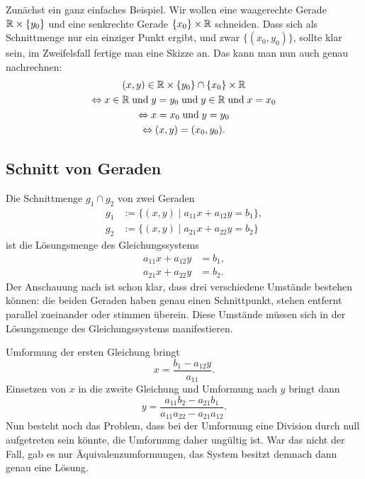 Zunächst ein ganz einfaches Beispiel. Wir wollen eine waagerechte
Gerade $\mathbb R\times\{y_0\}$ und eine senkrechte Gerade $\{x_0\}\times\mathbb R$
schneiden. Dass sich als Schnittmenge nur ein einziger Punkt ergibt,
und zwar $\{(x_0,y_0)\}$, sollte klar sein, im Zweifelsfall fertige
man eine Skizze an. Das kann man nun auch
genau nachrechnen:%
\begin{gather*}
(x,y)\in\mathbb R\times\{y_0\}\cap \{x_0\}\times\mathbb R\\
\Leftrightarrow x\in\mathbb R\;\text{und}\; y=y_0
\;\text{und}\;y\in\mathbb R\;\text{und}\;x=x_0\\
\Leftrightarrow x=x_0\;\text{und}\;y=y_0\\
\Leftrightarrow (x,y)=(x_0,y_0).
\end{gather*}

\subsection{Schnitt von Geraden}

Die Schnittmenge $g_1\cap g_2$ von zwei Geraden
\begin{equation}
\begin{split}
g_1 &:= \{(x,y)\mid a_{11}x+a_{12}y = b_1\},\\
g_2 &:= \{(x,y)\mid a_{21}x+a_{22}y = b_2\}
\end{split}
\end{equation}
ist die Lösungsmenge des Gleichungssystems
\begin{equation}
\begin{split}\label{eq:LGS}
a_{11}x+a_{12}y &= b_1,\\
a_{21}x+a_{22}y &= b_2.
\end{split}
\end{equation}
Der Anschauung nach ist schon klar, dass drei verschiedene
Umstände bestehen können: die beiden Geraden haben genau
einen Schnittpunkt, stehen entfernt parallel zueinander
oder stimmen überein. Diese Umstände müssen sich in der Lösungsmenge
des Gleichungssystems manifestieren.

Umformung der ersten Gleichung bringt
\[x = \frac{b_1-a_{12}y}{a_{11}}.\]
Einsetzen von $x$ in die zweite Gleichung
und Umformung nach $y$ bringt dann%
\begin{equation}
y = \frac{a_{11}b_2-a_{21}b_1}{a_{11}a_{22}-a_{21}a_{12}}.
\end{equation}
Nun besteht noch das Problem, dass bei der Umformung eine Division
durch null aufgetreten sein könnte, die Umformung daher ungültig ist.
War das nicht der Fall, gab es nur Äquivalenzumformungen, das
System besitzt demnach dann genau eine Lösung.

